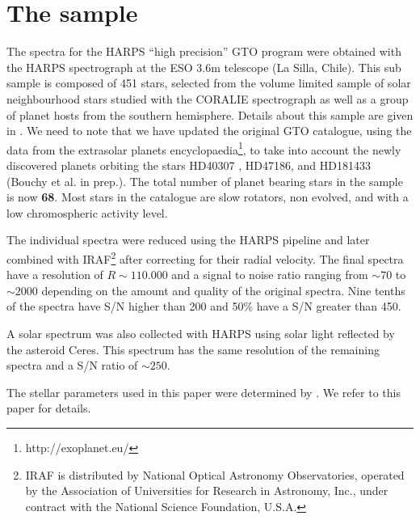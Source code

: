 \documentclass[oldversion]{aa}
\begin{document}
\section{The sample}
\label{sec:sample}

The spectra for the HARPS ``high precision'' GTO program were obtained with the HARPS spectrograph at the ESO 3.6m telescope (La Silla, Chile). This sub sample is composed of 451 stars, selected from the volume limited sample of solar neighbourhood stars studied with the CORALIE spectrograph \citep{Udry-2000} as well as a group of planet hosts from the southern hemisphere. Details about this sample are given in \citet{Sousa-2008}. We need to note that we have updated the original GTO catalogue, using the data from the extrasolar planets encyclopaedia\footnote{http://exoplanet.eu/}, to take into account the newly discovered planets orbiting the stars HD40307 \citep{Mayor-2008}, HD47186, and HD181433 (Bouchy et al. in prep.). The total number of planet bearing stars in the sample is now \textbf{68}. Most stars in the catalogue are slow rotators, non evolved, and with a low chromospheric activity level. %


The individual spectra were reduced using the HARPS pipeline and later combined with IRAF\footnote{IRAF is distributed by National Optical Astronomy Observatories, operated by the Association of Universities for Research in Astronomy, Inc., under contract with the National Science Foundation, U.S.A.} after correcting for their radial velocity. The final spectra have a resolution of $R\sim110.000$ and a signal to noise ratio ranging from $\sim70$ to $\sim2000$ depending on the amount and quality of the original spectra. Nine tenths of the spectra have S/N higher than 200 and 50\% have a S/N greater than 450.

A solar spectrum was also collected with HARPS using solar light reflected by the asteroid Ceres. This spectrum has the same resolution of the remaining spectra and a S/N ratio of $\sim250$. %

The stellar parameters used in this paper were determined by \citet{Sousa-2008}.%
We refer to this paper for details.
\end{document}
